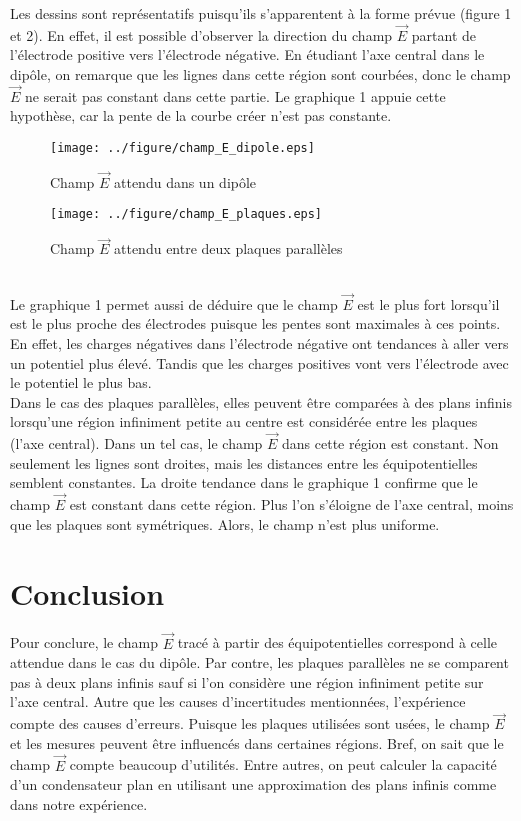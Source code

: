 \documentclass[11pt]{article}
\begin{document}
Les dessins sont représentatifs puisqu’ils s’apparentent à la forme prévue (figure 1 et 2). En effet, il est possible d’observer la direction du champ $\vec{E}$ partant de l’électrode positive vers l’électrode négative. En étudiant l’axe central dans le dipôle, on remarque que les lignes dans cette région sont courbées, donc le champ $\vec{E}$ ne serait pas constant dans cette partie. Le graphique 1 appuie cette hypothèse, car la pente de la courbe créer n’est pas constante.\pagebreak

\begin{minipage}{0.45\textwidth}
\begin{figure}[H]
    \centering
    \texttt{[image: ../figure/champ\_E\_dipole.eps]}
    \caption{Champ $\vec{E}$ attendu dans un dipôle}
\end{figure}
\end{minipage}
\hfill
\begin{minipage}{0.45\textwidth}
\begin{figure}[H]
    \centering
    \texttt{[image: ../figure/champ\_E\_plaques.eps]}
    \caption{Champ $\vec{E}$ attendu entre deux plaques parallèles}
\end{figure}
\end{minipage}\\

Le graphique 1 permet aussi de déduire que le champ $\vec{E}$ est le plus fort lorsqu’il est le plus proche des électrodes puisque les pentes sont maximales à ces points. En effet, les charges négatives dans l’électrode négative ont tendances à aller vers un potentiel plus élevé. Tandis que les charges positives vont vers l’électrode avec le potentiel le plus bas.\\

Dans le cas des plaques parallèles, elles peuvent être comparées à des plans infinis lorsqu’une région infiniment petite au centre est considérée entre les plaques (l'axe central). Dans un tel cas, le champ $\vec{E}$ dans cette région est constant. Non seulement les lignes sont droites, mais les distances entre les équipotentielles semblent constantes. La droite tendance dans le graphique 1 confirme que le champ $\vec{E}$ est constant dans cette région. Plus l'on s'éloigne de l'axe central, moins que les plaques sont symétriques. Alors, le champ n'est plus uniforme.\\

\section{Conclusion}
Pour conclure, le champ $\vec{E}$ tracé à partir des équipotentielles correspond à celle attendue dans le cas du dipôle. Par contre, les plaques parallèles ne se comparent pas à deux plans infinis sauf si l'on considère une région infiniment petite sur l'axe central. Autre que les causes d'incertitudes mentionnées, l'expérience compte des causes d'erreurs. Puisque les plaques utilisées sont usées, le champ $\vec{E}$ et les mesures peuvent être influencés dans certaines régions. Bref, on sait que le champ $\vec{E}$ compte beaucoup d'utilités. Entre autres, on peut calculer la capacité d'un condensateur plan en utilisant une approximation des plans infinis comme dans notre expérience.\\
\end{document}

